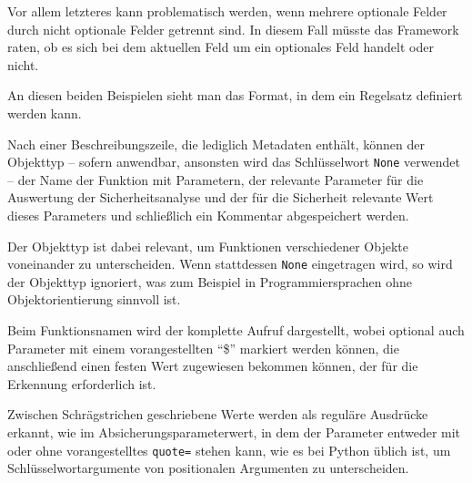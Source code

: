                 Vor allem letzteres kann problematisch werden,
                wenn mehrere optionale Felder durch nicht optionale Felder getrennt sind.
                In diesem Fall müsste das Framework raten,
                ob es sich bei dem aktuellen Feld um ein optionales Feld handelt oder
                nicht.

                

                

                An diesen beiden Beispielen sieht man das Format,
                in dem ein Regelsatz definiert werden kann.

                Nach einer Beschreibungszeile,
                die lediglich Metadaten enthält,
                können der Objekttyp
                -- sofern anwendbar,
                ansonsten wird das Schlüsselwort
                \lstinline{None} verwendet
                -- der Name der Funktion mit Parametern,
                der relevante Parameter für die Auswertung der Sicherheitsanalyse und
                der für die Sicherheit relevante Wert dieses Parameters und
                schließlich ein Kommentar abgespeichert werden.

                Der Objekttyp ist dabei relevant,
                um Funktionen verschiedener Objekte voneinander zu unterscheiden.
                Wenn stattdessen
                \lstinline{None} eingetragen wird,
                so wird der Objekttyp ignoriert,
                was zum Beispiel in Programmiersprachen ohne Objektorientierung sinnvoll ist.

                Beim Funktionsnamen wird der komplette Aufruf dargestellt,
                wobei optional auch Parameter mit einem vorangestellten
                \enquote{\$} markiert werden können,
                die anschließend einen festen Wert zugewiesen bekommen können,
                der für die Erkennung erforderlich ist.

                Zwischen Schrägstrichen geschriebene Werte werden als reguläre Ausdrücke erkannt,
                wie im Absicherungsparameterwert,
                in dem der Parameter
                 entweder mit oder
                ohne vorangestelltes
                \lstinline{quote=} stehen kann,
                wie es bei Python üblich ist,
                um Schlüsselwortargumente von positionalen Argumenten zu unterscheiden.

